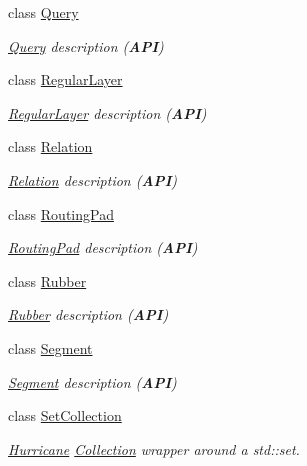 \begin{DoxyCompactItemize}
class \mbox{\hyperlink{classHurricane_1_1Query}{Query}}
\begin{DoxyCompactList}\small\item\em \mbox{\hyperlink{classHurricane_1_1Query}{Query}} description ({\bfseries A\+PI}) \end{DoxyCompactList}\item 
class \mbox{\hyperlink{classHurricane_1_1RegularLayer}{Regular\+Layer}}
\begin{DoxyCompactList}\small\item\em \mbox{\hyperlink{classHurricane_1_1RegularLayer}{Regular\+Layer}} description ({\bfseries A\+PI}) \end{DoxyCompactList}\item 
class \mbox{\hyperlink{classHurricane_1_1Relation}{Relation}}
\begin{DoxyCompactList}\small\item\em \mbox{\hyperlink{classHurricane_1_1Relation}{Relation}} description ({\bfseries A\+PI}) \end{DoxyCompactList}\item 
class \mbox{\hyperlink{classHurricane_1_1RoutingPad}{Routing\+Pad}}
\begin{DoxyCompactList}\small\item\em \mbox{\hyperlink{classHurricane_1_1RoutingPad}{Routing\+Pad}} description ({\bfseries A\+PI}) \end{DoxyCompactList}\item 
class \mbox{\hyperlink{classHurricane_1_1Rubber}{Rubber}}
\begin{DoxyCompactList}\small\item\em \mbox{\hyperlink{classHurricane_1_1Rubber}{Rubber}} description ({\bfseries A\+PI}) \end{DoxyCompactList}\item 
class \mbox{\hyperlink{classHurricane_1_1Segment}{Segment}}
\begin{DoxyCompactList}\small\item\em \mbox{\hyperlink{classHurricane_1_1Segment}{Segment}} description ({\bfseries A\+PI}) \end{DoxyCompactList}\item 
class \mbox{\hyperlink{classHurricane_1_1SetCollection}{Set\+Collection}}
\begin{DoxyCompactList}\small\item\em \mbox{\hyperlink{namespaceHurricane}{Hurricane}} \mbox{\hyperlink{classHurricane_1_1Collection}{Collection}} wrapper around a std\+::set. \end{DoxyCompactList}\item 

\end{DoxyCompactItemize}
